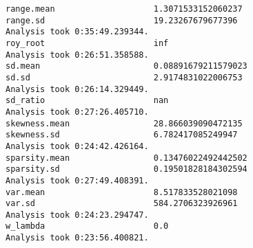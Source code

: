 \begin{lstlisting}[breaklines=true, basicstyle=\footnotesize, tabsize=1]
range.mean                    1.3071533152060237
range.sd                      19.23267679677396
Analysis took 0:35:49.239344.
roy_root                      inf
Analysis took 0:26:51.358588.
sd.mean                       0.08891679211579023
sd.sd                         2.9174831022006753
Analysis took 0:26:14.329449.
sd_ratio                      nan
Analysis took 0:27:26.405710.
skewness.mean                 28.866039090472135
skewness.sd                   6.782417085249947
Analysis took 0:24:42.426164.
sparsity.mean                 0.13476022492442502
sparsity.sd                   0.19501828184302594
Analysis took 0:27:49.408391.
var.mean                      8.517833528021098
var.sd                        584.2706323926961
Analysis took 0:24:23.294747.
w_lambda                      0.0
Analysis took 0:23:56.400821.
\end{lstlisting}